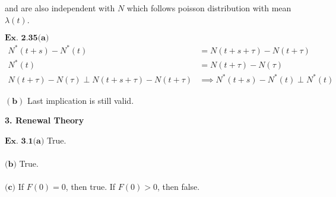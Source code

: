 \documentclass{article}
\begin{document}
and are also independent with $N$ which follows poisson distribution with mean $\lambda(t)$.

\vspace{0.2in}
${\textbf{Ex. 2.35(a)}}$
\begin{align*}
N^*(t+s)-N^*(t) &= N(t+s+\tau) - N(t+\tau)\\
N^*(t) &= N(t+\tau)-N(\tau)\\
N(t+\tau)-N(\tau) \perp N(t+s+\tau) - N(t+\tau) &\implies N^*(t+s)-N^*(t) \perp N^*(t)
\end{align*}

$\mathbf{(b)}$
Last implication is still valid.

\vspace{0.2in}
\begin{comment}
${\textbf{Ex. 2.36}}$

\vspace{0.2in}
${\textbf{Ex. 2.37}}$

\vspace{0.2in}
${\textbf{Ex. 2.38}}$

\vspace{0.2in}
${\textbf{Ex. 2.39}}$

\vspace{0.2in}
${\textbf{Ex. 2.40}}$

\vspace{0.2in}
${\textbf{Ex. 2.41}}$

\vspace{0.2in}
${\textbf{Ex. 2.42}}$

\vspace{0.2in}
\end{comment}
\clearpage
\begin{center}
    \textbf{\large{3. Renewal Theory}}
\end{center}

$\textbf{Ex. 3.1(a)}$ True.\\~\\

$\textbf{(b)}$ True.\\~\\

$\textbf{(c)}$ If $F(0) = 0$, then true. If $F(0) > 0$, then false.
\end{document}
